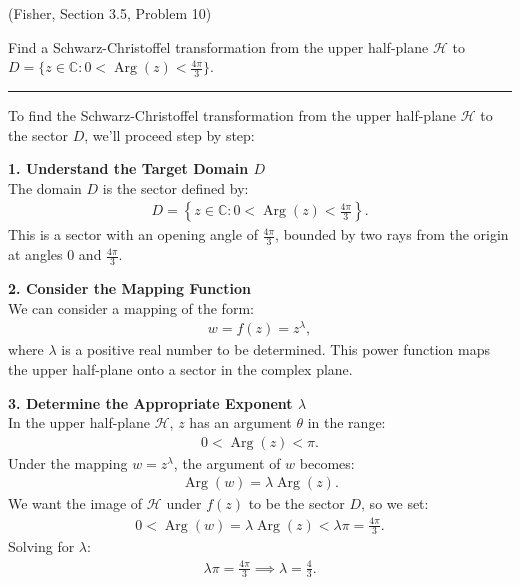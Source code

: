 \begin{example}
    (Fisher, Section 3.5, Problem 10)

    Find a Schwarz-Christoffel transformation from the upper half-plane $\mathcal{H}$ to $D = \{ z \in \mathbb{C} : 0 < \operatorname{Arg}(z) < \frac{4\pi}{3} \}$.

    \hrule
    \vspace{0.5cm}

    To find the Schwarz-Christoffel transformation from the upper half-plane $\mathcal{H}$ to the sector $D$, we'll proceed step by step:

    \textbf{1. Understand the Target Domain $D$} \\

    The domain $D$ is the sector defined by:
    \begin{align*}
        D = \left\{ z \in \mathbb{C} : 0 < \operatorname{Arg}(z) < \frac{4\pi}{3} \right\}.
    \end{align*}
    This is a sector with an opening angle of $\frac{4\pi}{3}$, bounded by two rays from the origin at angles $0$ and $\frac{4\pi}{3}$.

    \textbf{2. Consider the Mapping Function} \\

    We can consider a mapping of the form:
    \begin{align*}
        w = f(z) = z^\lambda,
    \end{align*}
    where $\lambda$ is a positive real number to be determined. This power function maps the upper half-plane onto a sector in the complex plane.

    \textbf{3. Determine the Appropriate Exponent $\lambda$} \\

    In the upper half-plane $\mathcal{H}$, $z$ has an argument $\theta$ in the range:
    \begin{align*}
        0 < \operatorname{Arg}(z) < \pi.
    \end{align*}
    Under the mapping $w = z^\lambda$, the argument of $w$ becomes:
    \begin{align*}
        \operatorname{Arg}(w) = \lambda \operatorname{Arg}(z).
    \end{align*}
    We want the image of $\mathcal{H}$ under $f(z)$ to be the sector $D$, so we set:
    \begin{align*}
        0 < \operatorname{Arg}(w) = \lambda \operatorname{Arg}(z) < \lambda \pi = \frac{4\pi}{3}.
    \end{align*}
    Solving for $\lambda$:
    \begin{align*}
        \lambda \pi = \frac{4\pi}{3} \implies \lambda = \frac{4}{3}.
    \end{align*}


\end{example}
